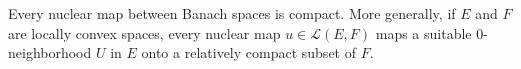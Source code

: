 Every nuclear map between Banach spaces is compact. More generally, if $E$ and $F$ are locally convex spaces, every nuclear map $u \in \mathcal{L}(E, F)$ maps a suitable $0$-neighborhood $U$ in $E$ onto a relatively compact subset of $F$.
